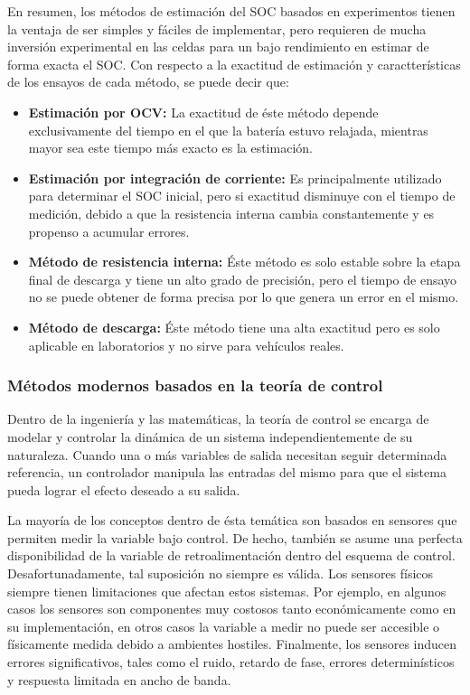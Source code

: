 \documentclass[10pt,a4paper]{article}
\begin{document}
\noindent En resumen, los m\'etodos de estimaci\'on del \acrshort{SOC} basados
en experimentos tienen la ventaja de ser simples y f\'aciles de implementar,
pero requieren de mucha inversi\'on experimental en las celdas para un bajo
rendimiento en estimar de forma exacta el \acrshort{SOC}. Con respecto a la
exactitud de estimaci\'on y caractter\'isticas de los ensayos de cada m\'etodo,
se puede decir que:

\begin{itemize}
    \item \textbf{Estimaci\'on por OCV:} La exactitud de \'este m\'etodo depende
        exclusivamente del tiempo en el que la bater\'ia estuvo relajada,
        mientras mayor sea este tiempo m\'as exacto es la estimaci\'on.
    \item \textbf{Estimaci\'on por integraci\'on de corriente:} Es
        principalmente utilizado para determinar el \acrshort{SOC} inicial, pero
        si exactitud disminuye con el tiempo de medici\'on, debido a que la
        resistencia interna cambia constantemente y es propenso a acumular
        errores.
    \item \textbf{M\'etodo de resistencia interna:} \'Este m\'etodo es solo
        estable sobre la etapa final de descarga y tiene un alto grado de
        precisi\'on, pero el tiempo de ensayo no se puede obtener de forma
        precisa por lo que genera un error en el mismo.
    \item \textbf{M\'etodo de descarga:} \'Este m\'etodo tiene una
        alta exactitud pero es solo aplicable en laboratorios y no sirve para
        veh\'iculos reales.
\end{itemize}


\subsubsection{M\'etodos modernos basados en la teor\'ia de control}
\label{controlTheoryMethod}

\noindent Dentro de la ingenier\'ia y las matem\'aticas, la teor\'ia de control 
se encarga de modelar y controlar la din\'amica de un sistema 
independientemente de su naturaleza. Cuando una o m\'as variables de salida 
necesitan seguir determinada referencia, un controlador manipula las 
entradas del mismo para que el sistema pueda lograr el efecto deseado a su 
salida.

\noindent La mayor\'ia de los conceptos dentro de \'esta tem\'atica son
basados en sensores que permiten medir la variable bajo control. De hecho, 
tambi\'en se asume una perfecta disponibilidad de la variable de 
retroalimentaci\'on dentro del esquema de control. Desafortunadamente, tal
suposici\'on no siempre es v\'alida. Los sensores f\'isicos siempre tienen
limitaciones que afectan estos sistemas. Por ejemplo, en algunos casos
los sensores son componentes muy costosos tanto econ\'omicamente como en su
implementaci\'on, en otros casos la variable a medir no puede ser accesible o 
f\'isicamente medida debido a ambientes hostiles. Finalmente, los sensores 
inducen errores significativos, tales como el ruido, retardo de fase, errores 
determin\'isticos y respuesta limitada en ancho de banda.
\end{document}
